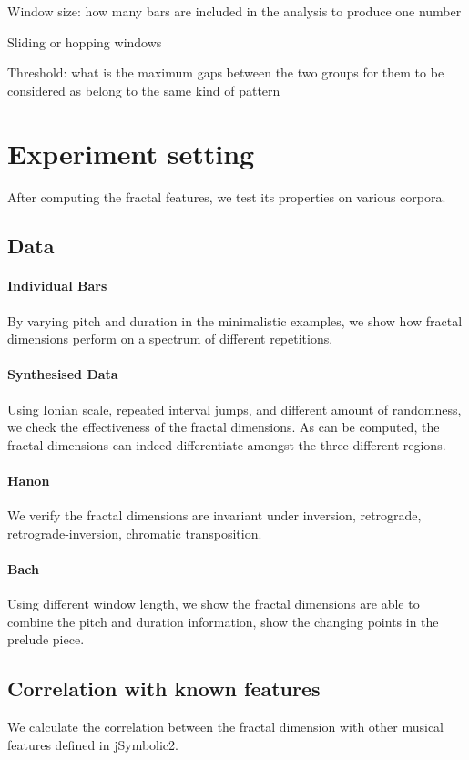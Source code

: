 \documentclass[acmsmall,review,anonymous]{acmart}\settopmatter{printfolios=true,printccs=false,printacmref=false}
\begin{document}
Window size: how many bars are included in the analysis to produce one number

Sliding or hopping windows

Threshold: what is the maximum gaps between the two groups for them to be considered as belong to the same kind of pattern


\section{Experiment setting}
After computing the fractal features, we test its properties on various corpora.
\subsection{Data}
\paragraph{Individual Bars}
By varying pitch and duration in the minimalistic examples, we show how fractal
dimensions perform on a spectrum of different repetitions.

\paragraph{Synthesised Data}
Using Ionian scale, repeated interval jumps, and different amount of randomness, we check the effectiveness of the fractal dimensions. As can be computed, the fractal dimensions can indeed differentiate amongst the three different regions.
\paragraph{Hanon}
We verify the fractal dimensions are invariant under inversion, retrograde,
retrograde-inversion, chromatic transposition.

\paragraph{Bach}
Using different window length, we show the fractal dimensions are able to
combine the pitch and duration information, show the changing points in the
prelude piece.

\subsection{Correlation with known features}
We calculate the correlation between the fractal dimension with other musical
features defined in jSymbolic2. 
\end{document}
